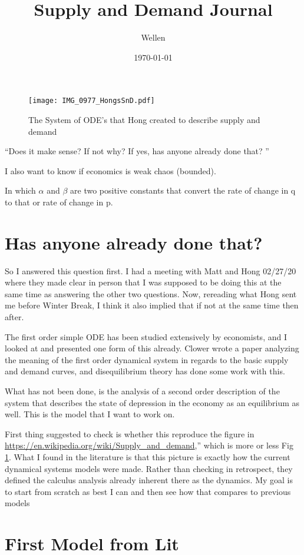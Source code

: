 \documentclass{article}
\title{Supply and Demand Journal}
\author{Wellen}
\date{\today}
\begin{document}
\begin{figure}%
\texttt{[image: IMG\_0977\_HongsSnD.pdf]}%
\caption{The System of ODE's that Hong created to describe supply and demand}%
\label{hong}%
\end{figure}

``Does it make sense?  If not why?  If yes, has anyone already done that? ''

I also want to know if economics is weak chaos (bounded).

In which $\alpha$ and $\beta$ are two positive constants that convert the rate of change in q to that or rate of change in p.

\section{Has anyone already done that?}
So I answered this question first. I had a meeting with Matt and Hong 02/27/20 where they made clear in person that I was supposed to be doing this at the same time as answering the other two questions. Now, rereading what Hong sent me before Winter Break, I think it also implied that if not at the same time then after. 

The first order simple ODE has been studied extensively by economists, and I looked at and presented one form of this already. Clower wrote a paper analyzing the meaning of the first order dynamical system in regards to the basic supply and demand curves, and disequilibrium theory has done some work with this. 

What has not been done, is the analysis of a second order description of the system that describes the state of depression in the economy as an equilibrium as well. This is the model that I want to work on.

First thing suggested to check is whether this reproduce the figure in
\url{https://en.wikipedia.org/wiki/Supply_and_demand},'' which is more or less Fig \ref{hong}. What I found in the literature is that this picture is exactly how the current dynamical systems models were made. Rather than checking in retrospect, they defined the calculus analysis already inherent there as the dynamics. My goal is to start from scratch as best I can and then see how that compares to previous models


\section{First Model from Lit}
\end{document}
